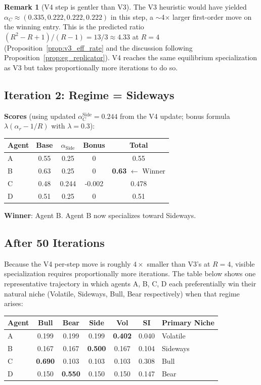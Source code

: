 \documentclass[11pt,a4paper]{article}
\theoremstyle{definition}
\newtheorem{remark}{Remark}[section]
\theoremstyle{plain}
\begin{document}
\begin{remark}[V4 step is gentler than V3]
The V3 heuristic would have yielded $\alpha_C \approx (0.335, 0.222, 0.222, 0.222)$ in
this step, a $\sim$4$\times$ larger first-order move on the winning entry.
This is the predicted ratio
$(R^2 - R + 1)/(R - 1) = 13/3 \approx 4.33$ at $R = 4$
(Proposition~\ref{prop:v3_eff_rate} and the discussion following
Proposition~\ref{prop:eg_replicator}). V4 reaches the same equilibrium
specialization as V3 but takes proportionally more iterations to do so.
\end{remark}

\subsection{Iteration 2: Regime = Sideways}

\textbf{Scores} (using updated $\alpha_C^{\text{Side}} = 0.244$ from the V4 update; bonus formula $\lambda(\alpha_r - 1/R)$ with $\lambda = 0.3$):
\begin{center}
\begin{tabular}{lcccc}
\toprule
Agent & Base & $\alpha_{\text{Side}}$ & Bonus & Total \\
\midrule
A & 0.55 & 0.25 & 0 & 0.55 \\
B & 0.63 & 0.25 & 0 & \textbf{0.63} $\leftarrow$ Winner \\
C & 0.48 & 0.244 & -0.002 & 0.478 \\
D & 0.51 & 0.25 & 0 & 0.51 \\
\bottomrule
\end{tabular}
\end{center}

\textbf{Winner}: Agent B. Agent B now specializes toward Sideways.

\subsection{After 50 Iterations}

Because the V4 per-step move is roughly $4\times$ smaller than V3's at $R = 4$,
visible specialization requires proportionally more iterations. The table
below shows one representative trajectory in which agents A, B, C, D each
preferentially win their natural niche (Volatile, Sideways, Bull, Bear
respectively) when that regime arises:

\begin{center}
\begin{tabular}{l|cccc|c|l}
\toprule
Agent & Bull & Bear & Side & Vol & SI & Primary Niche \\
\midrule
A & 0.199 & 0.199 & 0.199 & \textbf{0.402} & 0.040 & Volatile \\
B & 0.167 & 0.167 & \textbf{0.500} & 0.167 & 0.104 & Sideways \\
C & \textbf{0.690} & 0.103 & 0.103 & 0.103 & 0.308 & Bull \\
D & 0.150 & \textbf{0.550} & 0.150 & 0.150 & 0.147 & Bear \\
\bottomrule
\end{tabular}
\end{center}
\end{document}
